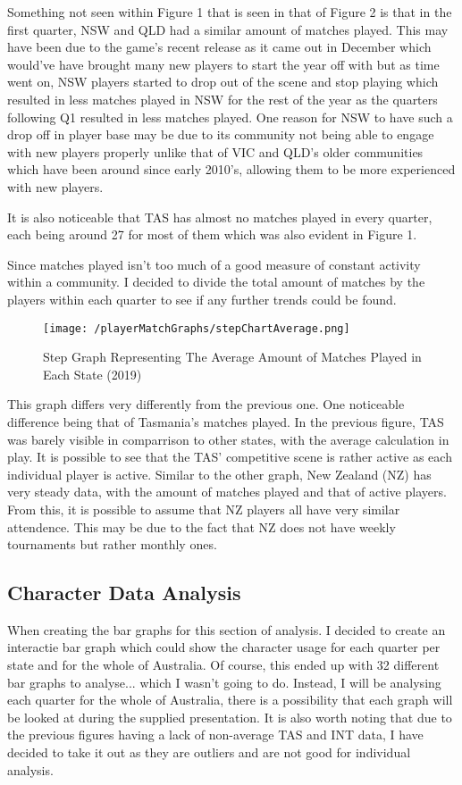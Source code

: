 \documentclass[11pt, oneside, a4paper]{article}
\begin{document}
Something not seen within Figure 1 that is seen in that of Figure 2 is that in the first quarter, NSW and QLD had a similar amount of matches played. This may have been due to the game's recent release as it came out in December which would've have brought many new players to start the year off with but as time went on, NSW players started to drop out of the scene and stop playing which resulted in less matches played in NSW for the rest of the year as the quarters following Q1 resulted in less matches played. One reason for NSW to have such a drop off in player base may be due to its community not being able to engage with new players properly unlike that of VIC and QLD's older communities which have been around since early 2010's, allowing them to be more experienced with new players.

It is also noticeable that TAS has almost no matches played in every quarter, each being around 27 for most of them which was also evident in Figure 1.

Since matches played isn't too much of a good measure of constant activity within a community. I decided to divide the total amount of matches by the players within each quarter to see if any further trends could be found.

\newpage
\begin{figure}[!ht]
	\centerline{\texttt{[image: /playerMatchGraphs/stepChartAverage.png]}}
	\caption{Step Graph Representing The Average Amount of Matches Played in Each State (2019)}
	\label{fig:figure2}
\end{figure}

This graph differs very differently from the previous one. One noticeable difference being that of Tasmania's matches played. In the previous figure, TAS was barely visible in comparrison to other states, with the average calculation in play. It is possible to see that the TAS' competitive scene is rather active as each individual player is active. Similar to the other graph, New Zealand (NZ) has very steady data, with the amount of matches played and that of active players. From this, it is possible to assume that NZ players all have very similar attendence. This may be due to the fact that NZ does not have weekly tournaments but rather monthly ones.

\subsection{Character Data Analysis}
When creating the bar graphs for this section of analysis. I decided to create an interactie bar graph which could show the character usage for each quarter per state and for the whole of Australia. Of course, this ended up with 32 different bar graphs to analyse... which I wasn't going to do. Instead, I will be analysing each quarter for the whole of Australia, there is a possibility that each graph will be looked at during the supplied presentation. It is also worth noting that due to the previous figures having a lack of non-average TAS and INT data, I have decided to take it out as they are outliers and are not good for individual analysis.
\end{document}
